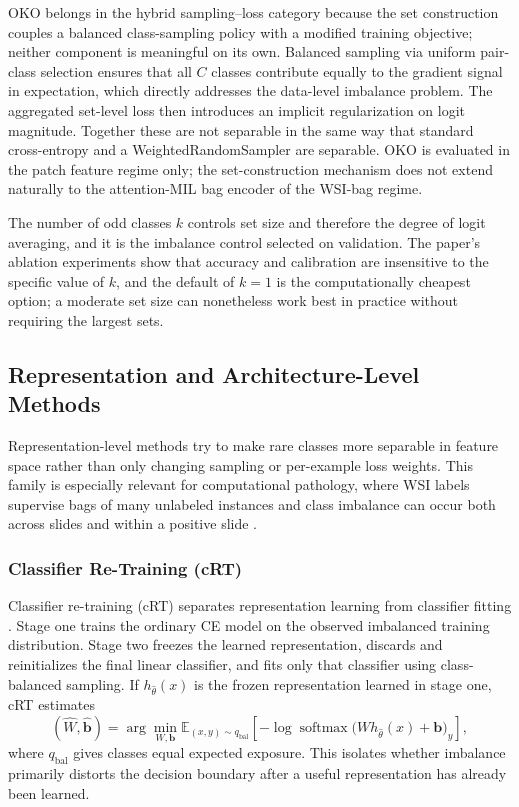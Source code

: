 \documentclass[11pt]{article}
\begin{document}
OKO belongs in the hybrid sampling--loss category because the set construction couples a balanced class-sampling policy with a modified training objective; neither component is meaningful on its own. Balanced sampling via uniform pair-class selection ensures that all $C$ classes contribute equally to the gradient signal in expectation, which directly addresses the data-level imbalance problem. The aggregated set-level loss then introduces an implicit regularization on logit magnitude. Together these are not separable in the same way that standard cross-entropy and a WeightedRandomSampler are separable. OKO is evaluated in the patch feature regime only; the set-construction mechanism does not extend naturally to the attention-MIL bag encoder of the WSI-bag regime.

The number of odd classes $k$ controls set size and therefore the degree of logit averaging, and it is the imbalance control selected on validation. The paper's ablation experiments show that accuracy and calibration are insensitive to the specific value of $k$, and the default of $k=1$ is the computationally cheapest option; a moderate set size can nonetheless work best in practice without requiring the largest sets.

\subsection{Representation and Architecture-Level Methods}
Representation-level methods try to make rare classes more separable in feature space rather than only changing sampling or per-example loss weights. This family is especially relevant for computational pathology, where WSI labels supervise bags of many unlabeled instances and class imbalance can occur both across slides and within a positive slide \citep{juyal2024scMil}.

\subsubsection{Classifier Re-Training (cRT)}
Classifier re-training (cRT) separates representation learning from classifier fitting \citep{kang2020decouplingRepresentation}. Stage one trains the ordinary CE model on the observed imbalanced training distribution. Stage two freezes the learned representation, discards and reinitializes the final linear classifier, and fits only that classifier using class-balanced sampling. If $h_{\widehat\theta}(x)$ is the frozen representation learned in stage one, cRT estimates
\begin{equation}
  (\widehat W,\widehat{\mathbf b})
  =\arg\min_{W,\mathbf b}
  \mathbb E_{(x,y)\sim q_{\mathrm{bal}}}
  \left[-\log\operatorname{softmax}
  \bigl(W h_{\widehat\theta}(x)+\mathbf b\bigr)_y\right],
  \label{eq:crt}
\end{equation}
where $q_{\mathrm{bal}}$ gives classes equal expected exposure. This isolates whether imbalance primarily distorts the decision boundary after a useful representation has already been learned.
\end{document}
